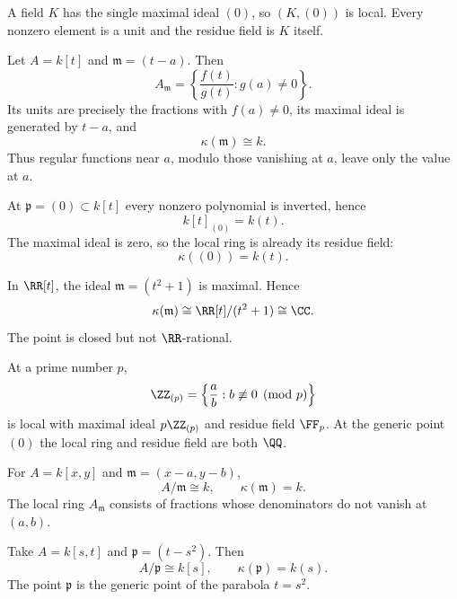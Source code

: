 \begin{example}
A field $K$ has the single maximal ideal $(0)$, so $(K,(0))$ is local.  Every nonzero element
is a unit and the residue field is $K$ itself.
\end{example}

\begin{example}
Let $A=k[t]$ and $\mathfrak m=(t-a)$.  Then
\[
A_{\mathfrak m}
=
\left\{\frac{f(t)}{g(t)}:g(a)\neq0\right\}.
\]
Its units are precisely the fractions with $f(a)\neq0$, its maximal ideal is generated by
$t-a$, and
\[
\kappa(\mathfrak m)\cong k.
\]
Thus regular functions near $a$, modulo those vanishing at $a$, leave only the value at $a$.
\end{example}

\begin{example}
At $\mathfrak p=(0)\subset k[t]$ every nonzero polynomial is inverted, hence
\[
k[t]_{(0)}=k(t).
\]
The maximal ideal is zero, so the local ring is already its residue field:
\[
\kappa((0))=k(t).
\]
\end{example}

\begin{example}
In $\RR[t]$, the ideal $\mathfrak m=(t^2+1)$ is maximal.  Hence
\[
\kappa(\mathfrak m)
\cong
\RR[t]/(t^2+1)
\cong\CC.
\]
The point is closed but not $\RR$-rational.
\end{example}

\begin{example}
At a prime number $p$,
\[
\ZZ_{(p)}
=
\left\{\frac ab:b\not\equiv0\pmod p\right\}
\]
is local with maximal ideal $p\ZZ_{(p)}$ and residue field $\FF_p$.  At the generic point
$(0)$ the local ring and residue field are both $\QQ$.
\end{example}

\begin{example}
For $A=k[x,y]$ and $\mathfrak m=(x-a,y-b)$,
\[
A/\mathfrak m\cong k,
\qquad
\kappa(\mathfrak m)=k.
\]
The local ring $A_{\mathfrak m}$ consists of fractions whose denominators do not vanish at
$(a,b)$.
\end{example}

\begin{example}
Take $A=k[s,t]$ and $\mathfrak p=(t-s^2)$.  Then
\[
A/\mathfrak p\cong k[s],
\qquad
\kappa(\mathfrak p)=k(s).
\]
The point $\mathfrak p$ is the generic point of the parabola $t=s^2$.
\end{example}

